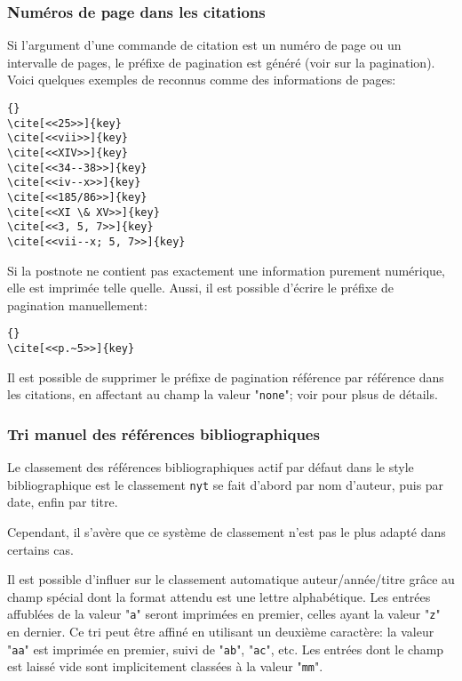 \documentclass{ltxdockit}
\newcommand*{\bibstylename}{droit-fr\xspace}
\begin{document}
\subsubsection{Numéros de page dans les citations}
\label{use_cav_pag}

Si l'argument  d'une commande de citation est un numéro de page ou un intervalle de pages, le préfixe de pagination est généré (voir  sur la pagination). Voici quelques exemples de  reconnus comme des informations de pages:

\begin{lstlisting}[style=latex]{}
\cite[<<25>>]{key}
\cite[<<vii>>]{key}
\cite[<<XIV>>]{key}
\cite[<<34--38>>]{key}
\cite[<<iv--x>>]{key}
\cite[<<185/86>>]{key}
\cite[<<XI \& XV>>]{key}
\cite[<<3, 5, 7>>]{key}
\cite[<<vii--x; 5, 7>>]{key}
\end{lstlisting}
%

Si la postnote ne contient pas exactement une information purement numérique, elle est imprimée telle quelle. Aussi, il est possible d'écrire le préfixe de pagination manuellement:

\begin{lstlisting}[style=latex]{}
\cite[<<p.~5>>]{key}
\end{lstlisting}
%
Il est possible de supprimer le préfixe de pagination référence par référence dans les citations, en affectant au champ  la valeur "\texttt{none}"; voir  pour plsus de détails.

\subsubsection{Tri manuel des références bibliographiques}
\label{use_srt}

Le classement des références bibliographiques actif par défaut dans le style bibliographique \sty{\bibstylename} est le classement \texttt{nyt} se fait d'abord par nom d'auteur, puis par date, enfin par titre.

Cependant, il s'avère que ce système de classement n'est pas le plus adapté dans certains cas.

Il est possible d'influer sur le classement automatique auteur/année/titre grâce au champ spécial  dont la format attendu est une lettre alphabétique. Les entrées affublées de la valeur "\texttt{a}" seront imprimées en premier, celles ayant la valeur "\texttt{z}" en dernier. Ce tri peut être affiné en utilisant un deuxième caractère: la valeur "\texttt{aa}" est imprimée en premier, suivi de "\texttt{ab}", "\texttt{ac}", etc. Les entrées dont le champ  est laissé vide sont implicitement classées à la valeur "\texttt{mm}".
\end{document}
